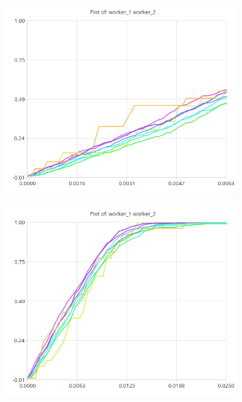 \begin{figure}[H]
            \centering
            \begin{subfigure}{.5\textwidth}
                \centering
                \includegraphics[width=0.98\textwidth]{img/w1w2.png}
                \label{fig:w1w2}
            \end{subfigure}%
            \begin{subfigure}{.5\textwidth}
                \centering
                \includegraphics[width =0.98\textwidth]{img/w1w2hb.png}
                \label{fig:sub2}
            \end{subfigure}
            \label{fig:w1w2hb}
            \end{figure}


